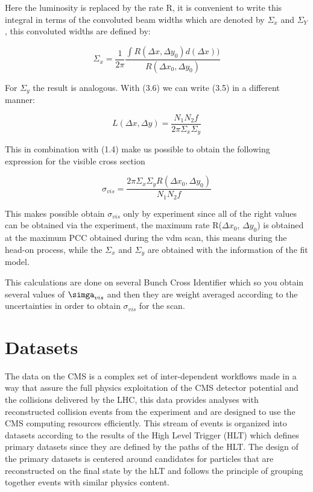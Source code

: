 Here the luminosity is replaced by the rate R, it is convenient to write this integral in terms of the convoluted beam widths which are denoted by $\Sigma_{x}$ and $\Sigma_{Y}$, this convoluted widths are defined by: 

\begin{equation}
\Sigma_{x} = \frac{1}{2 \pi} \frac{\int R(\Delta x, \Delta y_{0}) d(\Delta x) )}{R(\Delta x_{0}, \Delta y_{0})}
\end{equation}

For $\Sigma_{y}$ the result is analogous. With (3.6) we can write (3.5) in a different manner:

\begin{equation}
L(\Delta x, \Delta y) = \frac{N_{1}N_{2}f}{2 \pi \Sigma_{x} \Sigma_{y}}
\end{equation}  

This in combination with (1.4) make us possible to obtain the following expression for the visible cross section

\begin{equation}
\sigma_{vis} = \frac{2 \pi \Sigma_{x} \Sigma_{y} R(\Delta x_{0}, \Delta y_{0})}{N_{1} N_{2}f}
\end{equation}

This makes possible obtain $\sigma_{vis}$ only by experiment since all of the right values can be obtained via the experiment, the maximum rate R($\Delta x_{0}$, $\Delta y_{0}$) is obtained at the maximum PCC obtained during the vdm scan, this means during the head-on process, while the $\Sigma_{x}$ and $\Sigma_{y}$ are obtained with the information of the fit model. 

This calculations are done on several Bunch Cross Identifier which so you obtain several values of $\simga_{vis}$ and then they are weight averaged according to the uncertainties in order to obtain $\sigma_{vis}$ for the scan. 

\section{Datasets}

The data on the CMS is a complex set of inter-dependent workflows made in a way that assure the full physics exploitation of the CMS detector potential and the collisions delivered by the LHC, this data provides analyses with reconstructed collision events from the experiment and are designed to use the CMS computing resources efficiently. This stream of events is organized into datasets according to the results of the High Level Trigger (HLT) which defines primary datasets since they are defined by the paths of the HLT. The design of the primary datasets is centered around candidates for particles that are reconstructed on the final state by the hLT and follows the principle of grouping together events with similar physics content.    \cite{datasets1}

